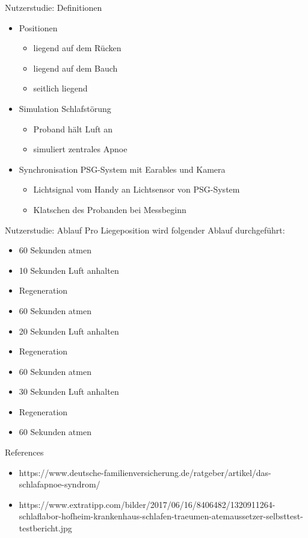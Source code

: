 \documentclass[18pt]{beamer}
\begin{document}
\begin{frame}{Nutzerstudie: Definitionen}
	\begin{itemize}
		\item Positionen
		\begin{itemize}
			\item liegend auf dem Rücken
			\item liegend auf dem Bauch
			\item seitlich liegend
		\end{itemize}
		\item Simulation Schlafstörung
		\begin{itemize}
			\item Proband hält Luft an
			\item simuliert zentrales Apnoe
		\end{itemize}
		\item Synchronisation PSG-System mit Earables und Kamera
		\begin{itemize}
			\item Lichtsignal vom Handy an Lichtsensor von PSG-System
			\item Klatschen des Probanden bei Messbeginn
		\end{itemize}
	\end{itemize}
\end{frame}
	
\begin{frame}{Nutzerstudie: Ablauf}
Pro Liegeposition wird folgender Ablauf durchgeführt:
\begin{itemize}
	\item 60 Sekunden atmen
	\item 10 Sekunden Luft anhalten
	\item Regeneration
	\item 60 Sekunden atmen
	\item 20 Sekunden Luft anhalten
	\item Regeneration
	\item 60 Sekunden atmen
	\item 30 Sekunden Luft anhalten
	\item Regeneration
	\item 60 Sekunden atmen
\end{itemize}
\end{frame}

\appendix
\beginbackup

\begin{frame}[allowframebreaks]{References}
\begin{itemize}
	\item https://www.deutsche-familienversicherung.de/ratgeber/artikel/das-schlafapnoe-syndrom/
	\item https://www.extratipp.com/bilder/2017/06/16/8406482/1320911264-schlaflabor-hofheim-krankenhaus-schlafen-traeumen-atemaussetzer-selbsttest-testbericht.jpg
\end{itemize}
\printbibliography
\end{frame}

\backupend
\end{document}
